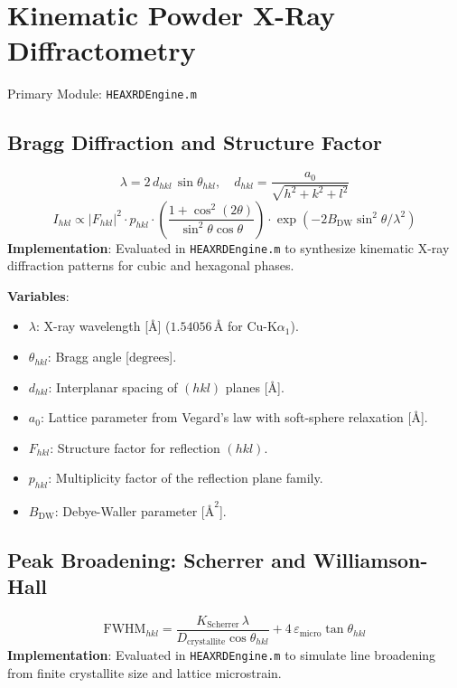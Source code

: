 \documentclass[11pt,a4paper]{article}
\begin{document}
\section{Kinematic Powder X-Ray Diffractometry}
Primary Module: \texttt{HEAXRDEngine.m}

\subsection{Bragg Diffraction and Structure Factor}
\begin{equation}
\lambda = 2 \, d_{hkl} \, \sin\theta_{hkl}, \quad d_{hkl} = \frac{a_0}{\sqrt{h^2 + k^2 + l^2}}
\end{equation}
\begin{equation}
I_{hkl} \propto |F_{hkl}|^2 \cdot p_{hkl} \cdot \left(\frac{1 + \cos^2(2\theta)}{\sin^2\theta \cos\theta}\right) \cdot \exp(-2 B_{\text{DW}} \sin^2\theta / \lambda^2)
\end{equation}
\textbf{Implementation}: Evaluated in \texttt{HEAXRDEngine.m} to synthesize kinematic X-ray diffraction patterns for cubic and hexagonal phases.

\noindent\textbf{Variables}:
\begin{itemize}
  \item $\lambda$: X-ray wavelength [$\text{\AA}$] ($1.54056 \, \text{\AA}$ for $\text{Cu-K}\alpha_1$).
  \item $\theta_{hkl}$: Bragg angle [$\text{degrees}$].
  \item $d_{hkl}$: Interplanar spacing of $(hkl)$ planes [$\text{\AA}$].
  \item $a_0$: Lattice parameter from Vegard's law with soft-sphere relaxation [$\text{\AA}$].
  \item $F_{hkl}$: Structure factor for reflection $(hkl)$.
  \item $p_{hkl}$: Multiplicity factor of the reflection plane family.
  \item $B_{\text{DW}}$: Debye-Waller parameter [$\text{\AA}^2$].
\end{itemize}

\subsection{Peak Broadening: Scherrer and Williamson-Hall}
\begin{equation}
\text{FWHM}_{hkl} = \frac{K_{\text{Scherrer}} \, \lambda}{D_{\text{crystallite}} \cos\theta_{hkl}} + 4 \, \varepsilon_{\text{micro}} \tan\theta_{hkl}
\end{equation}
\textbf{Implementation}: Evaluated in \texttt{HEAXRDEngine.m} to simulate line broadening from finite crystallite size and lattice microstrain.
\end{document}
